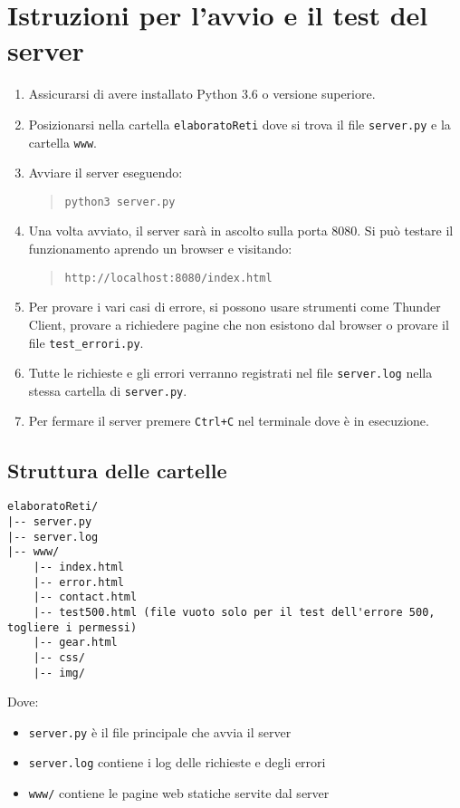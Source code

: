 \documentclass[a4paper,11pt]{article}
\begin{document}
\section*{Istruzioni per l'avvio e il test del server}
\begin{enumerate}
  \item Assicurarsi di avere installato Python 3.6 o versione superiore.
  \item Posizionarsi nella cartella \texttt{elaboratoReti} dove si trova il file \texttt{server.py} e la cartella \texttt{www}.
  \item Avviare il server eseguendo:
  \begin{quote}
    \texttt{python3 server.py}
  \end{quote}

  \item Una volta avviato, il server sarà in ascolto sulla porta 8080. Si può testare il funzionamento aprendo un browser e visitando:
  \begin{quote}
    \texttt{http://localhost:8080/index.html}
  \end{quote}

  \item Per provare i vari casi di errore, si possono usare strumenti come Thunder Client, provare a richiedere pagine che non esistono dal browser o provare il file \texttt{test\_errori.py}.
  \item Tutte le richieste e gli errori verranno registrati nel file \texttt{server.log} nella stessa cartella di \texttt{server.py}.
  \item Per fermare il server premere \texttt{Ctrl+C} nel terminale dove è in esecuzione.
\end{enumerate}



\subsection*{Struttura delle cartelle}

\begin{verbatim}
elaboratoReti/
|-- server.py
|-- server.log
|-- www/
    |-- index.html
    |-- error.html
    |-- contact.html
    |-- test500.html (file vuoto solo per il test dell'errore 500, togliere i permessi)
    |-- gear.html
    |-- css/
    |-- img/
\end{verbatim}

Dove:
\begin{itemize}
  \item \texttt{server.py} è il file principale che avvia il server
  \item \texttt{server.log} contiene i log delle richieste e degli errori
  \item \texttt{www/} contiene le pagine web statiche servite dal server
\end{itemize}
\end{document}

